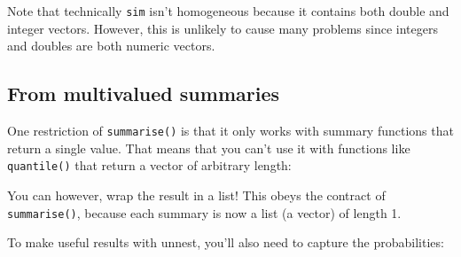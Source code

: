 \documentclass[]{book}
\newenvironment{Shaded}{\begin{snugshade}}{\end{snugshade}}
\newcommand{\KeywordTok}[1]{\textcolor[rgb]{0.13,0.29,0.53}{\textbf{{#1}}}}
\newcommand{\DataTypeTok}[1]{\textcolor[rgb]{0.13,0.29,0.53}{{#1}}}
\newcommand{\StringTok}[1]{\textcolor[rgb]{0.31,0.60,0.02}{{#1}}}
\newcommand{\CommentTok}[1]{\textcolor[rgb]{0.56,0.35,0.01}{\textit{{#1}}}}
\newcommand{\NormalTok}[1]{{#1}}
\begin{document}
Note that technically \texttt{sim} isn't homogeneous because it contains
both double and integer vectors. However, this is unlikely to cause many
problems since integers and doubles are both numeric vectors.

\subsection{From multivalued
summaries}\label{from-multivalued-summaries}

One restriction of \texttt{summarise()} is that it only works with
summary functions that return a single value. That means that you can't
use it with functions like \texttt{quantile()} that return a vector of
arbitrary length:

\begin{Shaded}
\end{Shaded}

You can however, wrap the result in a list! This obeys the contract of
\texttt{summarise()}, because each summary is now a list (a vector) of
length 1.

\begin{Shaded}
\end{Shaded}

To make useful results with unnest, you'll also need to capture the
probabilities:
\end{document}
